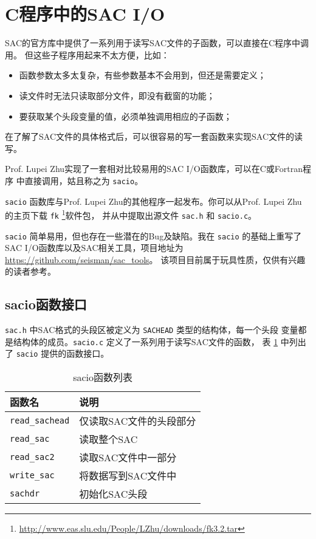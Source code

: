 \section{C程序中的SAC I/O}
SAC的官方库中提供了一系列用于读写SAC文件的子函数，可以直接在C程序中调用。
但这些子程序用起来不太方便，比如：
\begin{itemize}
\item 函数参数太多太复杂，有些参数基本不会用到，但还是需要定义；
\item 读文件时无法只读取部分文件，即没有截窗的功能；
\item 要获取某个头段变量的值，必须单独调用相应的子函数；
\end{itemize}

在了解了SAC文件的具体格式后，可以很容易的写一套函数来实现SAC文件的读写。

Prof. Lupei Zhu实现了一套相对比较易用的SAC I/O函数库，可以在C或Fortran程序
中直接调用，姑且称之为 \texttt{sacio}。

\texttt{sacio} 函数库与Prof. Lupei Zhu的其他程序一起发布。你可以从Prof. Lupei Zhu
的主页下载 \texttt{fk} \footnote{\url{http://www.eas.slu.edu/People/LZhu/downloads/fk3.2.tar}}软件包，
并从中提取出源文件 \texttt{sac.h} 和 \texttt{sacio.c}。

\texttt{sacio} 简单易用，但也存在一些潜在的Bug及缺陷。我在 \texttt{sacio} 的基础上重写了
SAC I/O函数库以及SAC相关工具，项目地址为 \url{https://github.com/seisman/sac_tools}。
该项目目前属于玩具性质，仅供有兴趣的读者参考。

\subsection{sacio函数接口}
\texttt{sac.h} 中SAC格式的头段区被定义为 \texttt{SACHEAD} 类型的结构体，每一个头段
变量都是结构体的成员。\texttt{sacio.c} 定义了一系列用于读写SAC文件的函数，
表 \ref{table:sacio-function} 中列出了 \texttt{sacio} 提供的函数接口。

\begin{table}[H]
\centering
\caption{sacio函数列表}
\label{table:sacio-function}
\begin{tabular}{ll}
\toprule
函数名      &   说明        \\
\midrule
\verb|read_sachead|      &   仅读取SAC文件的头段部分 \\
\verb|read_sac|          &   读取整个SAC \\
\verb|read_sac2|         &   读取SAC文件中一部分 \\
\verb|write_sac|         &   将数据写到SAC文件中 \\
\verb|sachdr|            &   初始化SAC头段\\
\bottomrule
\end{tabular}
\end{table}


